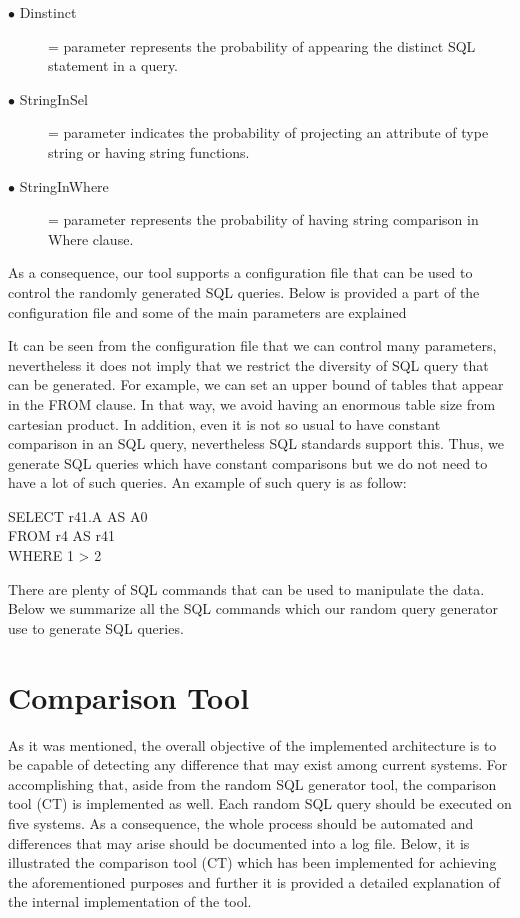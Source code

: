 \begin{description}
\item[$\bullet$ Dinstinct ] = parameter represents the probability of appearing the distinct SQL statement in a query. 

\item[$\bullet$ StringInSel] = parameter indicates the probability of projecting an attribute of type string or having string functions. 

\item[$\bullet$ StringInWhere] = parameter represents the probability of having string comparison in Where clause. 
\end{description} 

As a consequence, our tool supports a configuration file that can be used to control the randomly generated SQL queries. Below is provided a part of the configuration file and some of the main parameters are explained

It can be seen from the configuration file that we can control many parameters, nevertheless it does not imply that we restrict the diversity of SQL query that can be generated. For example, we can set an upper bound of tables that appear in the FROM clause. In that way, we avoid having an enormous table size from cartesian product. In addition, even it is not so usual to have constant comparison in an SQL query, nevertheless SQL standards support this. Thus, we generate SQL queries which have constant comparisons but we do not need to have a lot of such queries. An example of such query is as follow:

 
\begin{mdframed}[backgroundcolor=gray!20] 
SELECT r41.A AS A0
\\FROM r4 AS r41
\\WHERE 1 > 2
\end{mdframed}

There are plenty of SQL commands that can be used to manipulate the data. Below we summarize all the SQL commands which our random query generator use to generate SQL queries.   


\section{Comparison Tool} 
As it was mentioned, the overall objective of the implemented architecture is to be capable of detecting  any difference that may exist among current systems. For accomplishing that, aside from the random SQL generator tool,  the comparison tool (CT) is implemented as well. Each random SQL query should be executed on five systems. As a consequence, the whole process should be automated and differences that may arise should be documented into a log file. Below, it is illustrated the comparison tool (CT) which has been implemented for achieving the aforementioned purposes and further it is provided a detailed explanation of the internal implementation of the tool.  


